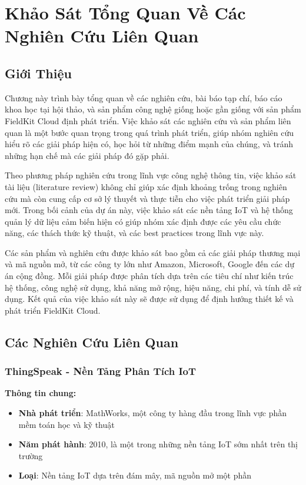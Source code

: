 \section{Khảo Sát Tổng Quan Về Các Nghiên Cứu Liên Quan}

\subsection{Giới Thiệu}

Chương này trình bày tổng quan về các nghiên cứu, bài báo tạp chí, báo cáo khoa học tại hội thảo, và sản phẩm công nghệ giống hoặc gần giống với sản phẩm FieldKit Cloud định phát triển. Việc khảo sát các nghiên cứu và sản phẩm liên quan là một bước quan trọng trong quá trình phát triển, giúp nhóm nghiên cứu hiểu rõ các giải pháp hiện có, học hỏi từ những điểm mạnh của chúng, và tránh những hạn chế mà các giải pháp đó gặp phải.

Theo phương pháp nghiên cứu trong lĩnh vực công nghệ thông tin, việc khảo sát tài liệu (literature review) không chỉ giúp xác định khoảng trống trong nghiên cứu mà còn cung cấp cơ sở lý thuyết và thực tiễn cho việc phát triển giải pháp mới. Trong bối cảnh của dự án này, việc khảo sát các nền tảng IoT và hệ thống quản lý dữ liệu cảm biến hiện có giúp nhóm xác định được các yêu cầu chức năng, các thách thức kỹ thuật, và các best practices trong lĩnh vực này.

Các sản phẩm và nghiên cứu được khảo sát bao gồm cả các giải pháp thương mại và mã nguồn mở, từ các công ty lớn như Amazon, Microsoft, Google đến các dự án cộng đồng. Mỗi giải pháp được phân tích dựa trên các tiêu chí như kiến trúc hệ thống, công nghệ sử dụng, khả năng mở rộng, hiệu năng, chi phí, và tính dễ sử dụng. Kết quả của việc khảo sát này sẽ được sử dụng để định hướng thiết kế và phát triển FieldKit Cloud.

\subsection{Các Nghiên Cứu Liên Quan}

\subsubsection{ThingSpeak - Nền Tảng Phân Tích IoT}

\textbf{Thông tin chung:}
\begin{itemize}
    \item \textbf{Nhà phát triển}: MathWorks, một công ty hàng đầu trong lĩnh vực phần mềm toán học và kỹ thuật
    \item \textbf{Năm phát hành}: 2010, là một trong những nền tảng IoT sớm nhất trên thị trường
    \item \textbf{Loại}: Nền tảng IoT dựa trên đám mây, mã nguồn mở một phần
\end{itemize}

